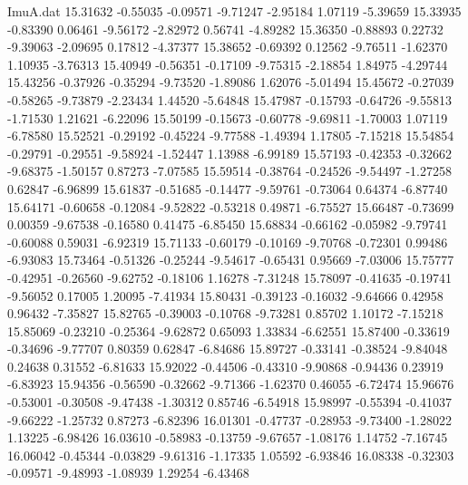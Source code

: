 \begin{filecontents}{ImuA.dat}
  15.31632   -0.55035   -0.09571   -9.71247   -2.95184    1.07119   -5.39659
  15.33935   -0.83390    0.06461   -9.56172   -2.82972    0.56741   -4.89282
  15.36350   -0.88893    0.22732   -9.39063   -2.09695    0.17812   -4.37377
  15.38652   -0.69392    0.12562   -9.76511   -1.62370    1.10935   -3.76313
  15.40949   -0.56351   -0.17109   -9.75315   -2.18854    1.84975   -4.29744
  15.43256   -0.37926   -0.35294   -9.73520   -1.89086    1.62076   -5.01494
  15.45672   -0.27039   -0.58265   -9.73879   -2.23434    1.44520   -5.64848
  15.47987   -0.15793   -0.64726   -9.55813   -1.71530    1.21621   -6.22096
  15.50199   -0.15673   -0.60778   -9.69811   -1.70003    1.07119   -6.78580
  15.52521   -0.29192   -0.45224   -9.77588   -1.49394    1.17805   -7.15218
  15.54854   -0.29791   -0.29551   -9.58924   -1.52447    1.13988   -6.99189
  15.57193   -0.42353   -0.32662   -9.68375   -1.50157    0.87273   -7.07585
  15.59514   -0.38764   -0.24526   -9.54497   -1.27258    0.62847   -6.96899
  15.61837   -0.51685   -0.14477   -9.59761   -0.73064    0.64374   -6.87740
  15.64171   -0.60658   -0.12084   -9.52822   -0.53218    0.49871   -6.75527
  15.66487   -0.73699    0.00359   -9.67538   -0.16580    0.41475   -6.85450
  15.68834   -0.66162   -0.05982   -9.79741   -0.60088    0.59031   -6.92319
  15.71133   -0.60179   -0.10169   -9.70768   -0.72301    0.99486   -6.93083
  15.73464   -0.51326   -0.25244   -9.54617   -0.65431    0.95669   -7.03006
  15.75777   -0.42951   -0.26560   -9.62752   -0.18106    1.16278   -7.31248
  15.78097   -0.41635   -0.19741   -9.56052    0.17005    1.20095   -7.41934
  15.80431   -0.39123   -0.16032   -9.64666    0.42958    0.96432   -7.35827
  15.82765   -0.39003   -0.10768   -9.73281    0.85702    1.10172   -7.15218
  15.85069   -0.23210   -0.25364   -9.62872    0.65093    1.33834   -6.62551
  15.87400   -0.33619   -0.34696   -9.77707    0.80359    0.62847   -6.84686
  15.89727   -0.33141   -0.38524   -9.84048    0.24638    0.31552   -6.81633
  15.92022   -0.44506   -0.43310   -9.90868   -0.94436    0.23919   -6.83923
  15.94356   -0.56590   -0.32662   -9.71366   -1.62370    0.46055   -6.72474
  15.96676   -0.53001   -0.30508   -9.47438   -1.30312    0.85746   -6.54918
  15.98997   -0.55394   -0.41037   -9.66222   -1.25732    0.87273   -6.82396
  16.01301   -0.47737   -0.28953   -9.73400   -1.28022    1.13225   -6.98426
  16.03610   -0.58983   -0.13759   -9.67657   -1.08176    1.14752   -7.16745
  16.06042   -0.45344   -0.03829   -9.61316   -1.17335    1.05592   -6.93846
  16.08338   -0.32303   -0.09571   -9.48993   -1.08939    1.29254   -6.43468

\end{filecontents}
